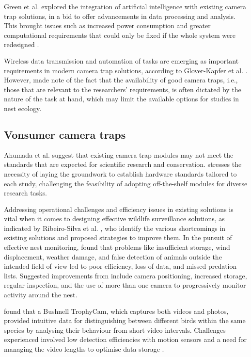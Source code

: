 \documentclass[class=report,11pt,crop=false]{standalone}
\begin{document}
Green et al. \cite{green2020innovations} explored the integration of artificial intelligence with existing camera trap solutions, in a bid to offer advancements in data processing and analysis. This brought issues such as increased power consumption and greater computational requirements that could only be fixed if the whole system were redesigned \cite{green2020innovations}. 

Wireless data transmission and automation of tasks are emerging as important requirements in modern camera trap solutions, according to Glover-Kapfer et al. \cite{glover2019camera}. However, \cite{glover2019camera} made note of the fact that the availability of good camera traps, i.e., those that are relevant to the researchers’ requirements, is often dictated by the nature of the task at hand, which may limit the available options for studies in nest ecology.  

\subsection{Vonsumer camera traps}

Ahumada et al. \cite{ahumada2020wildlife} suggest that existing camera trap modules may not meet the standards that are expected for scientific research and conservation. \cite{ahumada2020wildlife} stresses the necessity of laying the groundwork to establish hardware standards tailored to each study, challenging the feasibility of adopting off-the-shelf modules for diverse research tasks. 

Addressing operational challenges and efficiency issues in existing solutions is vital when it comes to designing effective wildlife surveillance solutions, as indicated by Ribeiro-Silva  et al. \cite{ribeiro-silva2018testing}, who identify the various shortcomings in existing solutions and proposed strategies to improve them. In the pursuit of effective nest monitoring, \cite{ribeiro-silva2018testing} found that problems like insufficient storage, wind displacement, weather damage, and false detection of animals outside the intended field of view led to poor efficiency, loss of data, and missed predation lists. Suggested improvements from \cite{ribeiro-silva2018testing} include camera positioning, increased storage, regular inspection, and the use of more than one camera to progressively monitor activity around the nest. 

\cite{ribeiro-silva2018testing} found that a Bushnell TrophyCam, which captures both videos and photos, provided intuitive data for distinguishing between different birds within the same species by analysing their behaviour from short video intervals. Challenges experienced involved low detection efficiencies with motion sensors and a need for managing the video lengths to optimise data storage \cite{ribeiro-silva2018testing}. 
\end{document}
